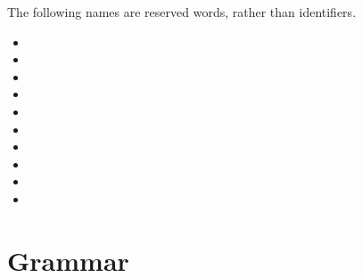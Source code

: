 The following names are reserved words, rather than identifiers.

\begin{multicols}{4}
    \singlespacing
    \begin{itemize}
        \item {}
        \item {}
        \item {}
        \item {}
        \item {}
        \item {}
        \item {}
        \item {}
        \item {}
        \item {}
    \end{itemize}
\end{multicols}

\section{Grammar}

